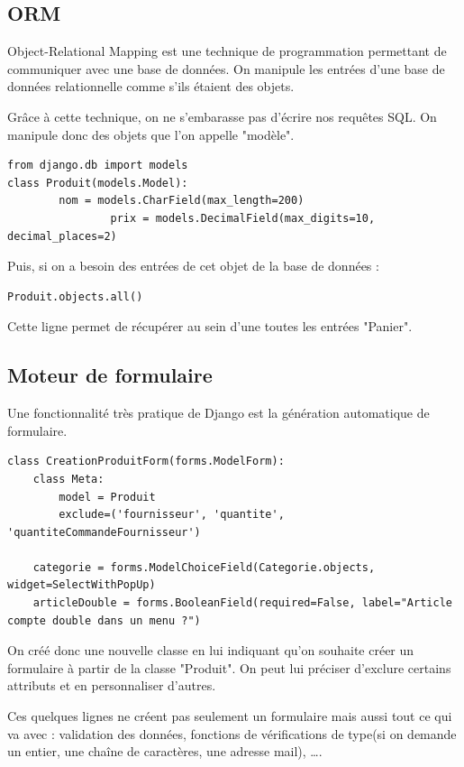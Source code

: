 \documentclass[twoside,UTF8]{EPURapport}
\begin{document}
    \subsection{ORM}
Object-Relational Mapping est une technique de programmation permettant de communiquer avec une base de données. On manipule les entrées d'une base de données relationnelle comme s'ils étaient des objets.

Grâce à cette technique, on ne s'embarasse pas d'écrire nos requêtes SQL. On manipule donc des objets que l'on appelle "modèle".

\lstset{language=Python}
\begin{lstlisting}
from django.db import models
class Produit(models.Model):
        nom = models.CharField(max_length=200)
                prix = models.DecimalField(max_digits=10, decimal_places=2)
\end{lstlisting}

Puis, si on a besoin des entrées de cet objet de la base de données :

\begin{lstlisting}
Produit.objects.all()
\end{lstlisting}

Cette ligne permet de récupérer au sein d'une toutes les entrées "Panier".

    \subsection{Moteur de formulaire}
Une fonctionnalité très pratique de Django est la génération automatique de formulaire.

\begin{lstlisting}
class CreationProduitForm(forms.ModelForm):
    class Meta:
        model = Produit
        exclude=('fournisseur', 'quantite', 'quantiteCommandeFournisseur')

    categorie = forms.ModelChoiceField(Categorie.objects, widget=SelectWithPopUp)
    articleDouble = forms.BooleanField(required=False, label="Article compte double dans un menu ?")
\end{lstlisting}

On créé donc une nouvelle classe en lui indiquant qu'on souhaite créer un formulaire à partir de la classe "Produit". On peut lui préciser d'exclure certains attributs et en personnaliser d'autres.

Ces quelques lignes ne créent pas seulement un formulaire mais aussi tout ce qui va avec : validation des données, fonctions de vérifications de type(si on demande un entier, une chaîne de caractères, une adresse mail), \ldots.
\end{document}
